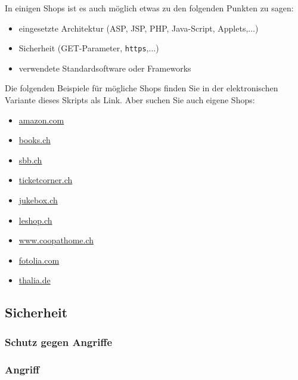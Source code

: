 In einigen Shops ist es auch möglich etwas zu den folgenden Punkten zu sagen:

\begin{itemize}
    \item eingesetzte Architektur (ASP, JSP, PHP, Java-Script, Applets,$\ldots$)
    \item Sicherheit (GET-Parameter, \texttt{https},$\ldots$)
    \item verwendete Standardsoftware oder Frameworks
\end{itemize}

Die folgenden Beispiele für mögliche Shops finden Sie in der elektronischen Variante
dieses Skripts als Link. Aber suchen Sie auch eigene Shops:

\begin{multicols}{3}
    \begin{itemize}
        \item\href{https://www.amazon.com}{amazon.com}
        \item\href{https://www.orellfuessli.ch/shop/home/show/}{books.ch}
        \item\href{https://www.sbb.ch/}{sbb.ch}
        \item\href{https://www.ticketcorner.ch}{ticketcorner.ch}
        \item\href{https://www.jukebox.ch}{jukebox.ch}
        \item\href{https://www.leshop.ch/}{leshop.ch}
        \item\href{https://www.coopathome.ch}{www.coopathome.ch}
        \item\href{https://de.fotolia.com}{fotolia.com}
        \item\href{https://www.thalia.de/}{thalia.de}
    \end{itemize}
\end{multicols}

\subsection{Sicherheit}
\label{subsec:sicherheit}

\subsubsection*{Schutz gegen Angriffe}
\subsubsection*{Angriff}

